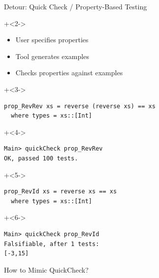 \begin{frame}[fragile]{Detour: Quick Check / Property-Based Testing}

\onslide+<2->
\begin{itemize}
\item User specifies properties
\item Tool generates examples
\item Checks properties against examples
\end{itemize}

\onslide+<3->
\begin{lstlisting}
prop_RevRev xs = reverse (reverse xs) == xs
  where types = xs::[Int]
\end{lstlisting}

\onslide+<4->
\begin{lstlisting}
Main> quickCheck prop_RevRev
OK, passed 100 tests.
\end{lstlisting}

\onslide+<5->
\begin{lstlisting}
prop_RevId xs = reverse xs == xs
  where types = xs::[Int]
\end{lstlisting}

\onslide+<6->
\begin{lstlisting}
Main> quickCheck prop_RevId
Falsifiable, after 1 tests:
[-3,15]
\end{lstlisting}

\end{frame}

\begin{frame}[fragile]{}

\begin{center}
{\Huge
How to Mimic QuickCheck?
}
\end{center}

\end{frame}


